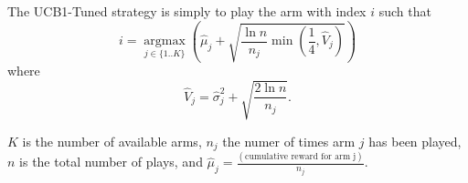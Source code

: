 The UCB1-Tuned strategy is simply to play the arm with index $i$ such that
\begin{displaymath}
    i = \operatorname*{argmax}_{j \in \{ 1..K \}} \left(\hat{\mu}_j + 
    \sqrt{\frac{\ln{n}}{n_j} \min(\frac{1}{4},\hat{V}_j)}\right)
\end{displaymath}
where 
\begin{displaymath}
    \hat{V}_j = \hat{\sigma}_j^2 + \sqrt{\frac{2\ln{n}}{n_j}}\text{.}
\end{displaymath}

$K$ is the number of available arms, $n_j$ the numer of times arm $j$ has 
been played, $n$ is the total number of plays, and $\hat{\mu}_j 
=\frac{(\text{cumulative reward for arm j})}{n_j}$.


% 
% 
% 
% 
% 
% 
